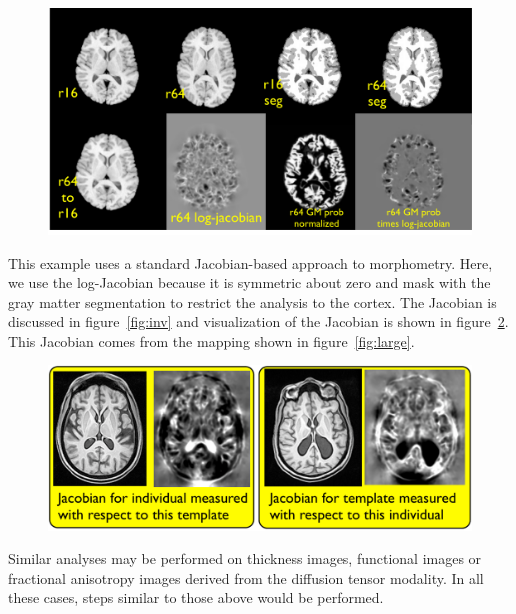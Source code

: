 \documentclass{InsightArticle}
\begin{document}
\begin{figure}
\includegraphics[width=1\textwidth]{Figures/morphometry.pdf}
\label{fig:morph}
\end{figure}
This example uses a standard Jacobian-based approach to morphometry.
Here, we use the log-Jacobian because it is symmetric about zero and
mask with the gray matter segmentation to restrict the analysis to the
cortex.  The Jacobian is discussed in figure~\ref{fig:inv} and visualization of
the Jacobian is shown in figure~\ref{fig:jac}.  This Jacobian comes
from the mapping shown in figure~\ref{fig:large}.
\begin{figure}
\includegraphics[width=1\textwidth]{Figures/Jacobian.pdf}
\label{fig:jac}
\end{figure}
Similar analyses may be performed on thickness images, functional 
images or fractional anisotropy images derived from the diffusion 
tensor modality.  In all these cases, steps similar to those above 
would be performed.  
\end{document}
